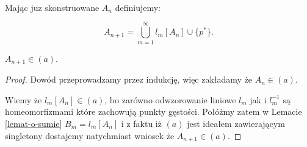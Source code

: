 \documentclass[12pt]{amsart}
\theoremstyle{plain}
\theoremstyle{definition}
\theoremstyle{remark}
\newcommand{\aideal}{\mathit{(a)}}
\newcommand{\aidealprime}{\mathit{(a^\prime)}}
\begin{document}
\smallskip
%
%
Mając juz skonstruowane $A_n$ definiujemy:

\[ A_{n + 1} = \bigcup_{m=1}^{\infty} l_m[A_n] \cup \lbrace p^* \rbrace.
\]

 $A_{n+1} \in \aideal$.
\begin{proof}
  Dowód przeprowadzamy przez indukcję, więc zakładamy
że $A_n \in \aideal$.

Wiemy że $l_m[A_n] \in \aideal$, bo zarówno odwzorowanie liniowe $l_m$
jak i $l_m^{-1}$ są homeomorfizmami które zachowują punkty gęstości.
Połóżmy zatem w Lemacie \ref{lemat-o-sumie} 
$B_m = l_m[A_n]$ i z faktu iż $\aideal$ jest ideałem
zawierającym singletony dostajemy natychmiast wniosek
że $A_{n+1} \in \aideal$.
\end{proof}
\end{document}
